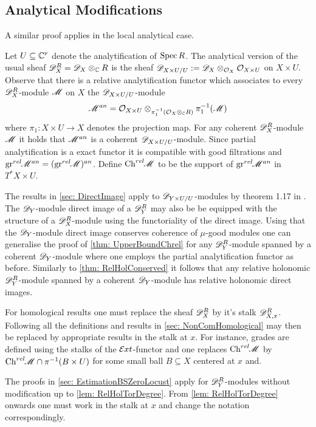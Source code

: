\subsection{Analytical Modifications}
A similar proof applies in the local analytical case.

Let $U\subseteq \mathbb{C}^r$ denote the analytification of $\operatorname{Spec} R$.
The analytical version of the usual sheaf $\mathscr{D}_X^R = \mathscr{D}_X \otimes_{\mathbb{C}} R$ is the sheaf $\mathscr{D}_{X\times U/U}:= \mathscr{D}_X \otimes_{\mathcal{O}_X}\mathcal{O}_{X\times U}$ on $X\times U$.
Observe that there is a relative analytification functor which associates to every $\mathscr{D}_X^R$-module $\mathscr{M}$ on $X$ the $\mathscr{D}_{X\times U/U}$-module
$$\mathscr{M}^{an} = \mathcal{O}_{X\times U} \otimes_{\pi_1^{-1}(\mathcal{O}_X\otimes_{\mathbb{C}} R)} \pi_1^{-1}(\mathscr{M})$$
where $\pi_1:X\times U \to X$ denotes the projection map.
For any coherent $\mathscr{D}_X^R$-module $\mathscr{M}$ it holds that $\mathscr{M}^{an}$ is a coherent $\mathscr{D}_{X\times U/U}$-module.
Since partial analytification is a exact functor it is compatible with good filtrations and $\operatorname{gr}^{rel}\mkern-5mu \mathscr{M}^{an}= (\operatorname{gr}^{rel}\mkern-5mu \mathscr{M})^{an}$. Define $\operatorname{Ch}^{rel}\mkern-5mu \mathscr{M}$ to be the support of $\operatorname{gr}^{rel}\mkern-5mu\mathscr{M}^{an}$ in $T^*X\times U$.


The results in \cref{sec: DirectImage} apply to $\mathscr{D}_{Y\times U/U}$-modules by theorem 1.17 in \cite{monteiro2016riemann}.
The $\mathscr{D}_Y$-module direct image of a $\mathscr{D}_Y^R$ may also be be equipped with the structure of a $\mathscr{D}_X^R$-module using the functoriality of the direct image.
Using that the $\mathscr{D}_Y$-module direct image conserves coherence of $\mu$-good modules one can generalise the proof of \cref{thm: UpperBoundChrel} for any $\mathscr{D}_Y^R$-module spanned by a coherent $\mathscr{D}_Y$-module where one employs the partial analytification functor as before.
Similarly to \cref{thm: RelHolConserved} it follows that any relative holonomic $\mathscr{D}_Y^R$-module spanned by a coherent $\mathscr{D}_Y$-module has relative holonomic direct images.

For homological results one must replace the sheaf $\mathscr{D}_X^R$ by it's stalk $\mathscr{D}_{X,x}^R$.
Following \cite{budur2019zero} all the definitions and results in \cref{sec: NonComHomological} may then be replaced by appropriate results in the stalk at $x$.
For instance, grades are defined using the stalks of the $\mathcal{E}\mkern -1mu xt$-functor and one replaces $\operatorname{Ch}^{rel}\mkern-5mu\mathscr{M}$ by $\operatorname{Ch}^{rel}\mkern-5mu\mathscr{M}\cap \pi^{-1}(B\times U)$ for some small ball $B\subseteq X$ centered at $x$ and.

The proofs in \cref{sec: EstimationBSZeroLocust} apply for $\mathscr{D}_Y^R$-modules without modification up to \cref{lem: RelHolTorDegree}.
From \cref{lem: RelHolTorDegree} onwards one must work in the stalk at $x$ and change the notation correspondingly.
